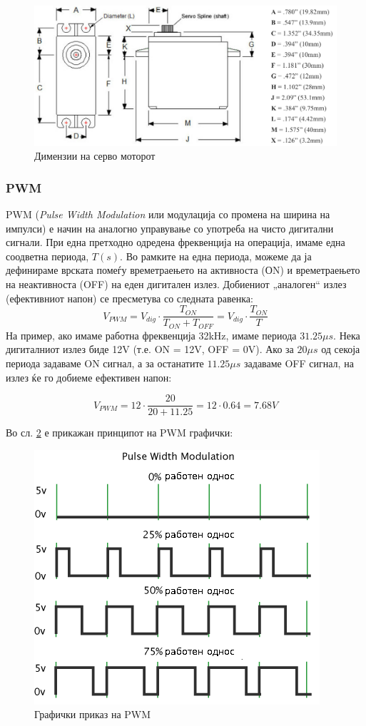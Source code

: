 \documentclass[11pt]{article}
\begin{document}
		  \begin{figure}[h]
        \includegraphics[width=0.75\linewidth]{./images/servo_schematic.png}
        \centering
        \caption{Димензии на серво моторот}
        \label{fig:servo_schematic.png}
        \end{figure}

    \subsubsection{PWM} \label{sec:pwm}
    	PWM (\textit{Pulse Width Modulation} или модулација со промена на ширина на импулси) е начин на аналогно управување со употреба на чисто дигитални сигнали. При една претходно одредена фреквенција на операција, имаме една соодветна периода, $T(s)$. Во рамките на една периода, можеме да ја дефинираме врската помеѓу времетраењето на активноста (ОN) и времетраењето на неактивноста (OFF) на еден дигитален излез. Добиениот „аналоген“ излез (ефективниот напон) се пресметува со следната равенка:\\
      \begin{equation}
        V_{PWM} = V_{dig} \cdot \frac{T_{ON}}{T_{ON} + T_{OFF}} = V_{dig} \cdot \frac{T_{ON}}{T}
      \end{equation}
      На пример, ако имаме работна фреквенција 32kHz, имаме периода $31.25\mu s$. Нека дигиталниот излез биде 12V (т.е. ON = 12V, OFF = 0V). Ако за $20\mu s$ од секоја периода задаваме ON сигнал, а за останатите $11.25\mu s$ задаваме OFF сигнал, на излез ќе го добиеме ефективен напон:

      $$ V_{PWM} = 12 \cdot \frac{20}{20+11.25} = 12 \cdot 0.64 = 7.68V $$

      Во сл. \ref{fig:pwm} е прикажан принципот на PWM графички:
      \begin{figure}[h]
        \centering
        \includegraphics[width = 0.6\linewidth]{./images/pwm_mk.png}
        \caption{Графички приказ на PWM}
        \label{fig:pwm}
      \end{figure}
\end{document}
